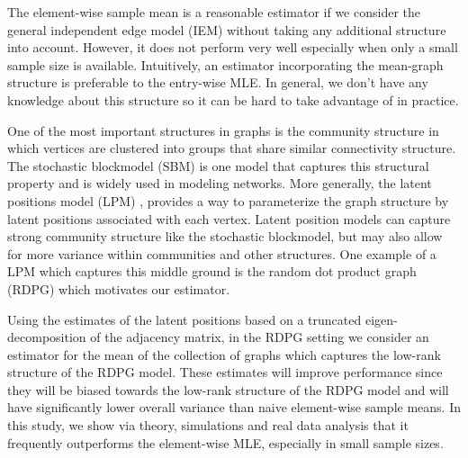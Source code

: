 \documentclass[10pt,letterpaper]{article}
\begin{document}
The element-wise sample mean is a reasonable estimator if we consider the general independent edge model (IEM) \cite{bollobas2007phase} without taking any additional structure into account. 
However, it does not perform very well especially when only a small sample size is available.
Intuitively, an estimator incorporating the mean-graph structure is preferable to the entry-wise MLE. 
In general, we don't have any knowledge about this structure so it can be hard to take advantage of in practice.



One of the most important structures in graphs is the community structure in which vertices are clustered into groups that share similar connectivity structure. The stochastic blockmodel (SBM) \cite{holland1983stochastic} is one model that captures this structural property and is widely used in modeling networks.
More generally, the latent positions model (LPM) \cite{hoff2002latent}, provides a way to parameterize the graph structure by latent positions associated with each vertex. 
Latent position models can capture strong community structure like the stochastic blockmodel, but may also allow for more variance within communities and other structures.
One example of a LPM which captures this middle ground is the random dot product graph (RDPG) \cite{young2007random, nickel2007random} which motivates our estimator. 

Using the estimates of the latent positions based on a truncated eigen-decomposition of the adjacency matrix,  in the RDPG setting we consider an estimator for the mean of the collection of graphs which captures the low-rank structure of the RDPG model.
These estimates will improve performance since they will be biased towards the low-rank structure of the RDPG model and will have significantly lower overall variance than naive element-wise sample means.
In this study, we show via theory, simulations and real data analysis that it frequently outperforms the element-wise MLE, especially in small sample sizes.


\end{document}
